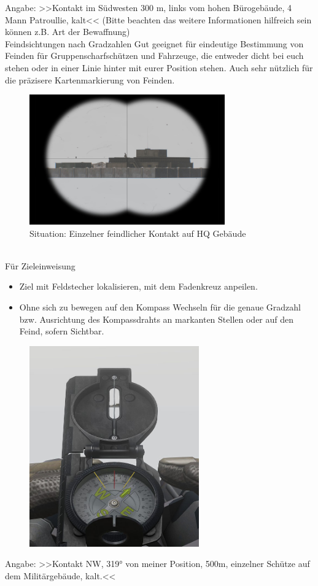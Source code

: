 Angabe: >>Kontakt im Südwesten 300 m, links vom hohen Bürogebäude, 4 Mann Patroullie, kalt<< (Bitte beachten das weitere Informationen hilfreich sein können z.B. Art der Bewaffnung)\\

Feindsichtungen nach Gradzahlen
Gut geeignet für eindeutige Bestimmung von Feinden für Gruppenscharfschützen und Fahrzeuge, die entweder dicht bei euch stehen oder in einer Linie hinter mit eurer Position stehen. Auch sehr nützlich für die präzisere Kartenmarkierung von Feinden.
\begin{figure}[!h]
	\centering
	\includegraphics[width=0.75\textwidth]{../img/advanced/kartenarbeit/Kompass3.jpg}
	\caption{Situation: Einzelner feindlicher Kontakt auf HQ Gebäude}
\end{figure}\\

Für Zieleinweisung
\begin{itemize}
	\item Ziel mit Feldstecher lokalisieren, mit dem Fadenkreuz anpeilen.
	\item Ohne sich zu bewegen auf den Kompass Wechseln für die genaue Gradzahl bzw. Ausrichtung des Kompassdrahts an markanten Stellen oder auf den Feind, sofern Sichtbar.
\end{itemize}

\begin{figure}[!h]
	\centering
	\includegraphics[width=0.65\textwidth]{../img/advanced/kartenarbeit/Kompass4.jpg}
\end{figure}
Angabe: >>Kontakt NW, 319° von meiner Position, 500m, einzelner Schütze auf dem Militärgebäude, kalt.<<\\

